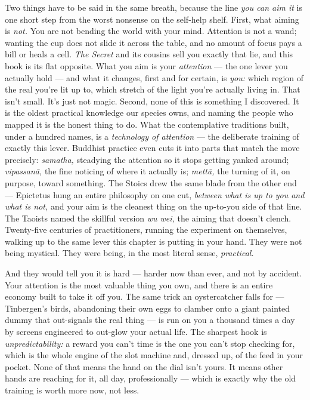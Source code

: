 \documentclass[11pt,openany]{book}
\begin{document}
Two things have to be said in the same breath, because the line \textit{you can aim it} is one short step from the worst nonsense on the self-help shelf. First, what aiming is \textit{not.} You are not bending the world with your mind. Attention is not a wand; wanting the cup does not slide it across the table, and no amount of focus pays a bill or heals a cell. \textit{The Secret} and its cousins sell you exactly that lie, and this book is its flat opposite. What you aim is your \textit{attention} — the one lever you actually hold — and what it changes, first and for certain, is \textit{you:} which region of the real you’re lit up to, which stretch of the light you’re actually living in. That isn’t small. It’s just not magic. Second, none of this is something I discovered. It is the oldest practical knowledge our species owns, and naming the people who mapped it is the honest thing to do. What the contemplative traditions built, under a hundred names, is a \textit{technology of attention} — the deliberate training of exactly this lever. Buddhist practice even cuts it into parts that match the move precisely: \textit{samatha,} steadying the attention so it stops getting yanked around; \textit{vipassanā,} the fine noticing of where it actually is; \textit{mettā,} the turning of it, on purpose, toward something. The Stoics drew the same blade from the other end — Epictetus hung an entire philosophy on one cut, \textit{between what is up to you and what is not,} and your aim is the cleanest thing on the up-to-you side of that line. The Taoists named the skillful version \textit{wu wei,} the aiming that doesn’t clench. Twenty-five centuries of practitioners, running the experiment on themselves, walking up to the same lever this chapter is putting in your hand. They were not being mystical. They were being, in the most literal sense, \textit{practical.}

And they would tell you it is hard — harder now than ever, and not by accident. Your attention is the most valuable thing you own, and there is an entire economy built to take it off you. The same trick an oystercatcher falls for — Tinbergen’s birds, abandoning their own eggs to clamber onto a giant painted dummy that out-signals the real thing — is run on you a thousand times a day by screens engineered to out-glow your actual life. The sharpest hook is \textit{unpredictability:} a reward you can’t time is the one you can’t stop checking for, which is the whole engine of the slot machine and, dressed up, of the feed in your pocket. None of that means the hand on the dial isn’t yours. It means other hands are reaching for it, all day, professionally — which is exactly why the old training is worth more now, not less.
\end{document}
